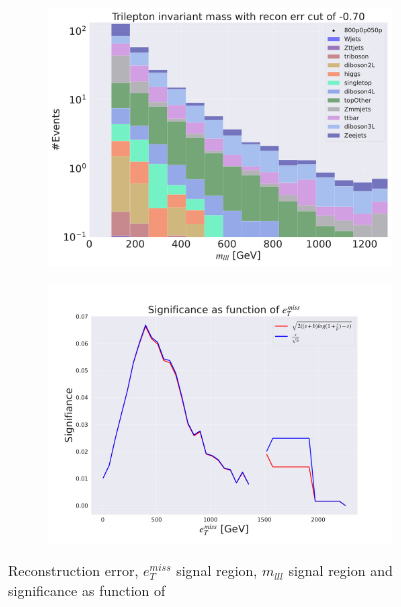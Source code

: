 \begin{figure}[H]
    \hfill
    \begin{subfigure}{.40\textwidth}
        \includegraphics[width=\textwidth]{Figures/AE_testing/small/3lep/b_data_recon_big_rm3_feats_sig_800p0p050p_mlll_recon_errcut_-0.70.pdf}
        \caption{}
        \label{fig:AE_3lep_small_mlll_800_3}
    \end{subfigure}
    \hfill   
    \begin{subfigure}{.40\textwidth}
        \includegraphics[width=\textwidth]{Figures/AE_testing/small/3lep/significance_etmiss_800p0p050p_-0.7044693201264449.pdf}
        \caption{}
        \label{fig:AE_3lep_small_signi_800_3}
    \end{subfigure}
    \hfill      
    \caption[3lep shallow network | $800p50$ | AE | 3]{Reconstruction error, $e_T^{miss}$ signal region, $m_{lll}$ signal region and significance as function of 
}
\end{figure}
